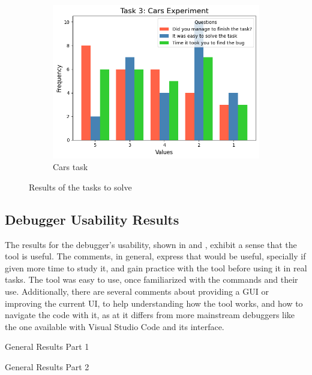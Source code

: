 \begin{figure}[hptb]
\begin{subfigure}[b]{0.32\textwidth}
        \includegraphics[width=\textwidth]{figures/task3}
        \caption{Cars task}
        \label{fig:task3}
    \end{subfigure}
    \caption{Results of the tasks to solve}
    \label{fig:general-know}
\end{figure}


\subsection{Debugger Usability Results}
\label{sec:usability}

The results for  the debugger's usability, shown in  and 
, exhibit a sense that the tool is useful. The comments, in general,  
express that \flik would be useful, specially if given more time to study it, and gain practice with the 
tool before using it in real tasks. The tool was easy to use, once familiarized with the commands and 
their use. Additionally, there are several comments about providing a GUI or improving the current UI,
to help understanding how the tool works, and how to navigate the code with it, as at it differs from 
more mainstream debuggers like the one available with Visual Studio Code and its interface.

\begin{table}[H]
  \centering
  \caption{General Results Part 1}
  
  \label{tab:general1-debuggers}
\end{table}

\begin{table}[H]
  \centering
  \caption{General Results Part 2}
  
  \label{tab:general2-debuggers}
\end{table}

